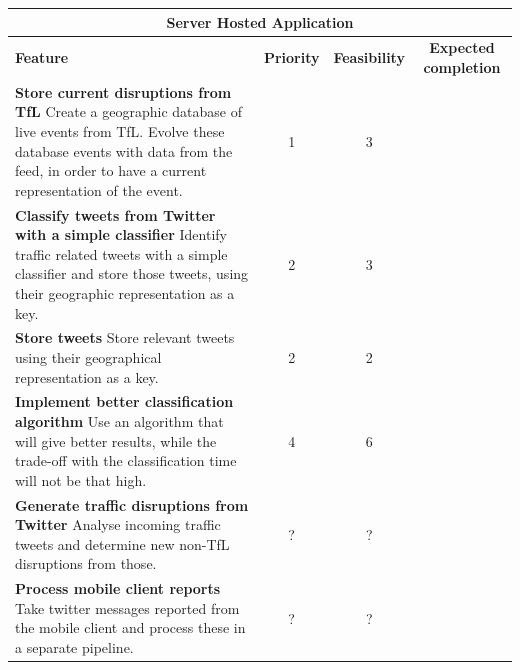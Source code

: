\begin{center}
\begin{tabular}{ | p{6cm} | c | c | c | }
\hline
\multicolumn{4}{|c|}{\textbf{Server Hosted Application}} \\ \hline
\textbf{Feature} & \textbf{Priority} & \textbf{Feasibility} & \textbf{Expected completion} \\ \hline
\textbf{Store current disruptions from TfL} \newline
Create a geographic database of live events from TfL. Evolve these database events with data from the feed, in order to have a current representation of the event. & 1 & 3 & \\ \hline
\textbf{Classify tweets from Twitter with a simple classifier} \newline
Identify traffic related tweets with a simple classifier and store those tweets, using their geographic representation as a key. & 2 & 3 & \\ \hline
\textbf{Store tweets} \newline
Store relevant tweets using their geographical representation as a key. & 2 & 2 & \\ \hline
\textbf{Implement better classification algorithm} \newline
Use an algorithm that will give better results, while the trade-off with the classification time will not be that high. & 4 & 6 & \\ \hline
\textbf{Generate traffic disruptions from Twitter} \newline
Analyse incoming traffic tweets and determine new non-TfL disruptions from those. & ? & ? & \\ \hline
\textbf{Process mobile client reports} \newline
Take twitter messages reported from the mobile client and process these in a separate pipeline. & ? & ? & \\ \hline
\end{tabular}
\end{center}

